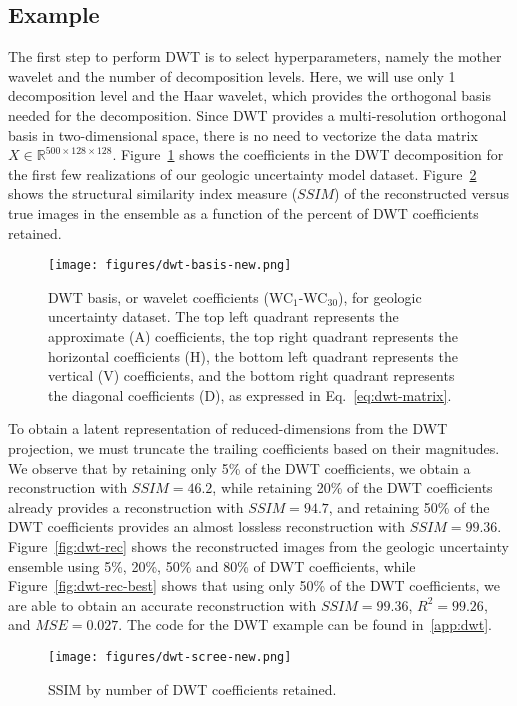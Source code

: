 \documentclass[a4paper,fleqn,12pt]{article}
\begin{document}
\subsection*{Example}
The first step to perform DWT is to select hyperparameters, namely the mother wavelet and the number of decomposition levels. Here, we will use only 1 decomposition level and the Haar wavelet, which provides the orthogonal basis needed for the decomposition. Since DWT provides a multi-resolution orthogonal basis in two-dimensional space, there is no need to vectorize the data matrix $X\in\mathbb{R}^{500\times128\times128}$. Figure~\ref{fig:dwt-basis} shows the coefficients in the DWT decomposition for the first few realizations of our geologic uncertainty model dataset. Figure~\ref{fig:dwt-scree} shows the structural similarity index measure ($SSIM$) of the reconstructed versus true images in the ensemble as a function of the percent of DWT coefficients retained. 

\begin{figure}[H]
    \centering
    \texttt{[image: figures/dwt-basis-new.png]}
    \caption{DWT basis, or wavelet coefficients (WC$_1$-WC$_{30}$), for geologic uncertainty dataset. The top left quadrant represents the approximate (A) coefficients, the top right quadrant represents the horizontal coefficients (H), the bottom left quadrant represents the vertical (V) coefficients, and the bottom right quadrant represents the diagonal coefficients (D), as expressed in Eq.~\ref{eq:dwt-matrix}.}
    \label{fig:dwt-basis}
\end{figure}

To obtain a latent representation of reduced-dimensions from the DWT projection, we must truncate the trailing coefficients based on their magnitudes. We observe that by retaining only 5\% of the DWT coefficients, we obtain a reconstruction with $SSIM=46.2$, while retaining 20\% of the DWT coefficients already provides a reconstruction with $SSIM=94.7$, and retaining 50\% of the DWT coefficients provides an almost lossless reconstruction with $SSIM=99.36$. Figure~\ref{fig:dwt-rec} shows the reconstructed images from the geologic uncertainty ensemble using 5\%, 20\%, 50\% and 80\% of DWT coefficients, while Figure~\ref{fig:dwt-rec-best} shows that using only 50\% of the DWT coefficients, we are able to obtain an accurate reconstruction with $SSIM=99.36$, $R^2=99.26$, and $MSE=0.027$. The code for the DWT example can be found in~\ref{app:dwt}.

\begin{figure}[H]
    \centering
    \texttt{[image: figures/dwt-scree-new.png]}
    \caption{SSIM by number of DWT coefficients retained.}
    \label{fig:dwt-scree}
\end{figure}
\end{document}
